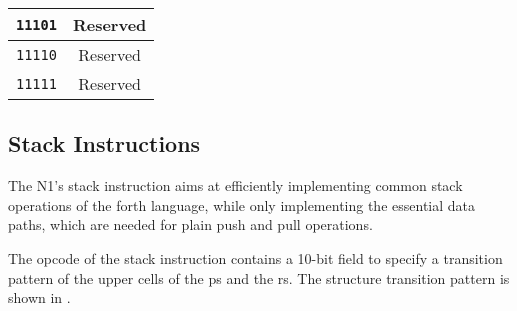 \begin{center}
\begin{longtable}{|c|c|c|c|}
      \texttt{11101}                     &
      \multicolumn{3}{c|}{Reserved}      \\ \hline


      \texttt{11110}                     &
      \multicolumn{3}{c|}{Reserved}      \\ \hline

      \texttt{11111}                     &
      \multicolumn{3}{c|}{Reserved}      \\ \hline
    
  \end{longtable}
\end{center}  
\endgroup

\subsection{Stack Instructions}
\label{opcodes:stack}

The N1's stack instruction aims at efficiently implementing common stack operations
of the \Gls{forth} language, while only implementing the essential data paths, which are
needed for plain push and pull operations.

The opcode of the stack instruction contains a 10-bit field to specify a transition
pattern of the upper \glspl{cell} of the \gls{ps} and the \gls{rs}. 
The structure transition pattern is shown in .
    
